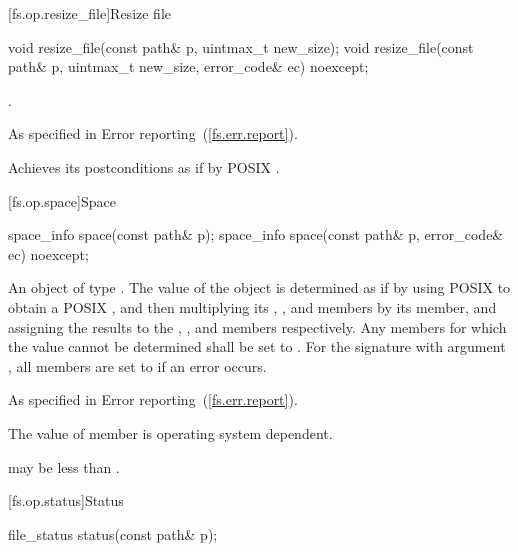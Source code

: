 [fs.op.resize_file]{Resize file}

%
\begin{itemdecl}
void resize_file(const path& p, uintmax_t new_size);
void resize_file(const path& p, uintmax_t new_size, error_code& ec) noexcept;
\end{itemdecl}

\begin{itemdescr}
\pnum
\postconditions {}.

\pnum
\throws As specified in Error reporting~(\ref{fs.err.report}).

\pnum
\remarks Achieves its postconditions as if by POSIX .
\end{itemdescr}


[fs.op.space]{Space}

%
\begin{itemdecl}
space_info space(const path& p);
space_info space(const path& p, error_code& ec) noexcept;
\end{itemdecl}

\begin{itemdescr}
\pnum
\returns An object of type . The value of the 
  object is determined as if by using POSIX 
  to obtain a POSIX ,
  and then multiplying its , ,
  and  members by its  member,
  and assigning the results to the , ,
  and  members respectively. Any members for which the
  value cannot be determined shall be set to .
  For the signature with argument , all members are set to
   if an error occurs.

\pnum
\throws As specified in Error reporting~(\ref{fs.err.report}).

\pnum
\remarks The value of member 
      is operating system dependent. \begin{note}  may be
      less than . \end{note}
\end{itemdescr}


[fs.op.status]{Status}

%
\begin{itemdecl}
file_status status(const path& p);
\end{itemdecl}

